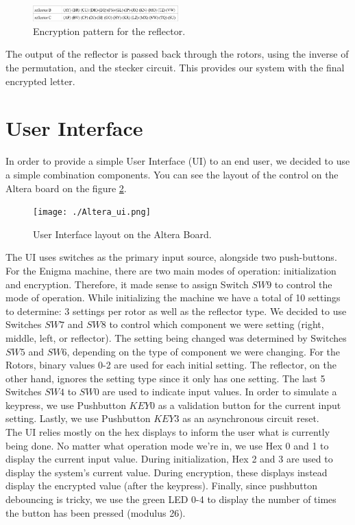 \documentclass[10pt]{article}
\begin{document}
\begin{figure}[!htb]
    \centering
    \includegraphics[width=0.5\textwidth]{./reflector_encryption.png}
    \caption{Encryption pattern for the reflector.}
    \label{fig:reflector_encryption}
\end{figure}
The output of the reflector is passed back through the rotors, using the inverse of the permutation, and the stecker circuit. This provides our system with the final encrypted letter.

\section{User Interface}
In order to provide a simple User Interface (UI) to an end user, we decided to use a simple combination components. You can see the layout of the control on the Altera board on the figure \ref{fig:Altera_ui}.\\
\begin{figure}[!htb]
    \centering
    \texttt{[image: ./Altera\_ui.png]}
    \caption{User Interface layout on the Altera Board.}
    \label{fig:Altera_ui}
\end{figure}
The UI uses switches as the primary input source, alongside two push-buttons. For the Enigma machine, there are two main modes of operation: initialization and encryption. Therefore, it made sense to assign Switch $SW9$ to control the mode of operation. While initializing the machine we have a total of 10 settings to determine: 3 settings per rotor as well as the reflector type. We decided to use Switches $SW7$ and $SW8$ to control which component we were setting (right, middle, left, or reflector). The setting being changed was determined by Switches $SW5$ and $SW6$, depending on the type of component we were changing. For the Rotors, binary values 0-2 are used for each initial setting. The reflector, on the other hand, ignores the setting type since it only has one setting. The last 5 Switches $SW4$ to $SW0$ are used to indicate input values. In order to simulate a keypress, we use Pushbutton $KEY0$ as a validation button for the current input setting. Lastly, we use Pushbutton $KEY3$ as an asynchronous circuit reset.\\

The UI relies mostly on the hex displays to inform the user what is currently being done. No matter what operation mode we're in, we use Hex 0 and 1 to display the current input value. During initialization, Hex 2 and 3 are used to display the system's current value. During encryption, these displays instead display the encrypted value (after the keypress). Finally, since pushbutton debouncing is tricky, we use the green LED 0-4 to display the number of times the button has been pressed (modulus 26).\\
\end{document}
